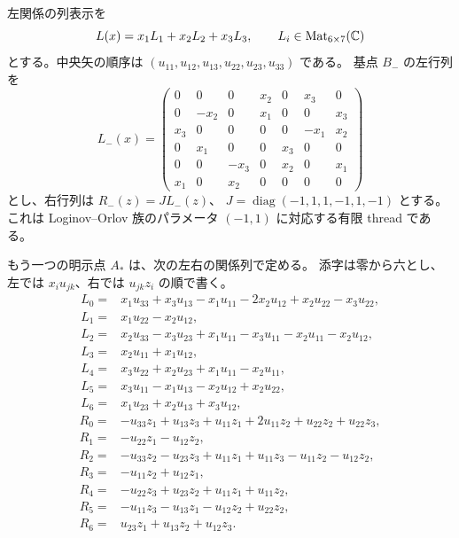 左関係の列表示を
\[
 L(x)=x_1L_1+x_2L_2+x_3L_3,\qquad L_i\in\operatorname{Mat}_{6\times7}(\mathbb C)
\]
とする。中央矢の順序は $(u_{11},u_{12},u_{13},u_{22},u_{23},u_{33})$ である。
基点 $B_-$ の左行列を
\begin{equation}\label{eq:Lminus}
 L_-(x)=\begin{pmatrix}
 0&0&0&x_2&0&x_3&0\\
 0&-x_2&0&x_1&0&0&x_3\\
 x_3&0&0&0&0&-x_1&x_2\\
 0&x_1&0&0&x_3&0&0\\
 0&0&-x_3&0&x_2&0&x_1\\
 x_1&0&x_2&0&0&0&0
 \end{pmatrix}
\end{equation}
とし、右行列は $R_-(z)=JL_-(z)$、
$J=\operatorname{diag}(-1,1,1,-1,1,-1)$ とする。
これは Loginov--Orlov 族のパラメータ $(-1,1)$ に対応する有限 thread である。

もう一つの明示点 $A_*$ は、次の左右の関係列で定める。
添字は零から六とし、左では $x_iu_{jk}$、右では $u_{jk}z_i$ の順で書く。
\begin{equation}\label{eq:Astar-left}
\begin{aligned}
 L_0={}&x_1u_{33}+x_3u_{13}-x_1u_{11}-2x_2u_{12}+x_2u_{22}-x_3u_{22},\\
 L_1={}&x_1u_{22}-x_2u_{12},\\
 L_2={}&x_2u_{33}-x_3u_{23}+x_1u_{11}-x_3u_{11}-x_2u_{11}-x_2u_{12},\\
 L_3={}&x_2u_{11}+x_1u_{12},\\
 L_4={}&x_3u_{22}+x_2u_{23}+x_1u_{11}-x_2u_{11},\\
 L_5={}&x_3u_{11}-x_1u_{13}-x_2u_{12}+x_2u_{22},\\
 L_6={}&x_1u_{23}+x_2u_{13}+x_3u_{12},
\end{aligned}
\end{equation}
\begin{equation}\label{eq:Astar-right}
\begin{aligned}
 R_0={}&-u_{33}z_1+u_{13}z_3+u_{11}z_1+2u_{11}z_2+u_{22}z_2+u_{22}z_3,\\
 R_1={}&-u_{22}z_1-u_{12}z_2,\\
 R_2={}&-u_{33}z_2-u_{23}z_3+u_{11}z_1+u_{11}z_3-u_{11}z_2-u_{12}z_2,\\
 R_3={}&-u_{11}z_2+u_{12}z_1,\\
 R_4={}&-u_{22}z_3+u_{23}z_2+u_{11}z_1+u_{11}z_2,\\
 R_5={}&-u_{11}z_3-u_{13}z_1-u_{12}z_2+u_{22}z_2,\\
 R_6={}&u_{23}z_1+u_{13}z_2+u_{12}z_3.
\end{aligned}
\end{equation}

